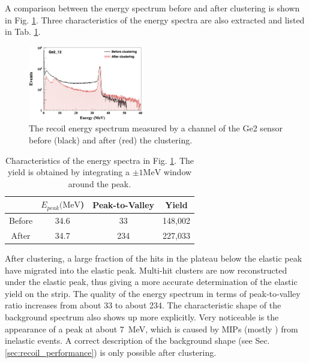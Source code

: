 \documentclass[number,5p]{elsarticle}
\begin{document}
A comparison between the energy spectrum before and after clustering is shown in Fig. \ref{fig:clustering}.
Three characteristics of the energy spectra are also extracted and listed in Tab. \ref{tab:clustering}.
\begin{figure}[t!]
  \centering
  \includegraphics[width=0.45\textwidth]{./clustering.png}
  \caption{The recoil energy spectrum measured by a channel of the Ge2 sensor before (black) and after (red) the clustering.}
  \label{fig:clustering}
\end{figure}
\begin{table}[h!]
  \centering
  \caption{Characteristics of the energy spectra in Fig.
    \ref{fig:clustering}. The yield is obtained by integrating a $\pm 1\si{\MeV}$ window around the peak.}
  \label{tab:clustering}
  \begin{tabular}{cccc}
    \hline
    & $E_{peak}(\si{\MeV}$) & Peak-to-Valley & Yield \\
    \hline
    Before & 34.6 & 33  & 148,002 \\
    After  & 34.7 & 234 & 227,033 \\
    \hline
  \end{tabular}
\end{table}
After clustering, a large fraction of the hits in the plateau below the elastic
peak have migrated into the elastic peak.
Multi-hit clusters are now reconstructed under the elastic peak, thus
giving a more accurate determination of the elastic yield on the strip.
The quality of the energy spectrum in terms of peak-to-valley ratio increases from about 33 to about 234.
The characteristic shape of the background spectrum also shows up more explicitly.
Very noticeable is the appearance of a peak at about \SI{7}{\MeV},
which is caused by MIPs (mostly \Pgppm) from inelastic events.
A correct description of the background shape (see Sec.
\ref{sec:recoil_performance}) is only possible after clustering.
\end{document}
